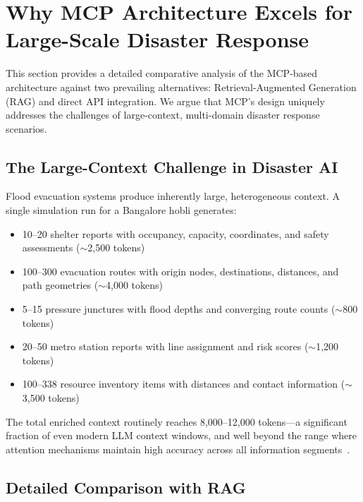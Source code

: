 \documentclass[journal]{IEEEtran}
\begin{document}
\section{Why MCP Architecture Excels for Large-Scale Disaster Response}
\label{sec:comparison}

This section provides a detailed comparative analysis of the MCP-based
architecture against two prevailing alternatives: Retrieval-Augmented
Generation (RAG) and direct API integration. We argue that MCP's design
uniquely addresses the challenges of large-context, multi-domain disaster
response scenarios.

\subsection{The Large-Context Challenge in Disaster AI}

Flood evacuation systems produce inherently large, heterogeneous context.
A single simulation run for a Bangalore hobli generates:
\begin{itemize}[leftmargin=*]
    \item 10--20 shelter reports with occupancy, capacity, coordinates,
    and safety assessments ($\sim$2,500 tokens)
    \item 100--300 evacuation routes with origin nodes, destinations,
    distances, and path geometries ($\sim$4,000 tokens)
    \item 5--15 pressure junctures with flood depths and converging route
    counts ($\sim$800 tokens)
    \item 20--50 metro station reports with line assignment and risk scores
    ($\sim$1,200 tokens)
    \item 100--338 resource inventory items with distances and contact
    information ($\sim$3,500 tokens)
\end{itemize}

The total enriched context routinely reaches 8,000--12,000 tokens---a
significant fraction of even modern LLM context windows, and well beyond
the range where attention mechanisms maintain high accuracy across all
information segments~\cite{liu2024lost}.

\subsection{Detailed Comparison with RAG}
\end{document}
